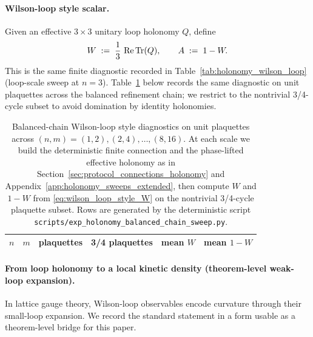 \paragraph{Wilson-loop style scalar.}
Given an effective $3\times 3$ unitary loop holonomy $Q$, define
\begin{equation}
\label{eq:wilson_loop_style_W}
W\;:=\;\frac{1}{3}\,\operatorname{Re}\mathrm{Tr}(Q),
\qquad
A\;:=\;1-W.
\end{equation}
This is the same finite diagnostic recorded in Table~\ref{tab:holonomy_wilson_loop} (loop-scale sweep at $n=3$).
Table~\ref{tab:holonomy_balanced_chain_wilson} below records the same diagnostic on unit plaquettes across the balanced refinement chain; we restrict to the nontrivial 3/4-cycle subset to avoid domination by identity holonomies.

\begin{table}[t]
\centering
\scriptsize
\setlength{\tabcolsep}{8pt}
\renewcommand{\arraystretch}{1.15}
\begin{tabular}{rrrrrr}
\toprule
$n$ & $m$ & plaquettes & 3/4 plaquettes & mean $W$ & mean $1-W$ \\
\midrule
%
\end{tabular}
\caption{Balanced-chain Wilson-loop style diagnostics on unit plaquettes across $(n,m)=(1,2),(2,4),\dots,(8,16)$. At each scale we build the deterministic finite connection and the phase-lifted effective holonomy as in Section~\ref{sec:protocol_connections_holonomy} and Appendix~\ref{app:holonomy_sweeps_extended}, then compute $W$ and $1-W$ from \eqref{eq:wilson_loop_style_W} on the nontrivial 3/4-cycle plaquette subset. Rows are generated by the deterministic script \texttt{scripts/exp\_holonomy\_balanced\_chain\_sweep.py}.}
\label{tab:holonomy_balanced_chain_wilson}
\end{table}

\paragraph{From loop holonomy to a local kinetic density (theorem-level weak-loop expansion).}
In lattice gauge theory, Wilson-loop observables encode curvature through their small-loop expansion.
We record the standard statement in a form usable as a theorem-level bridge for this paper.


